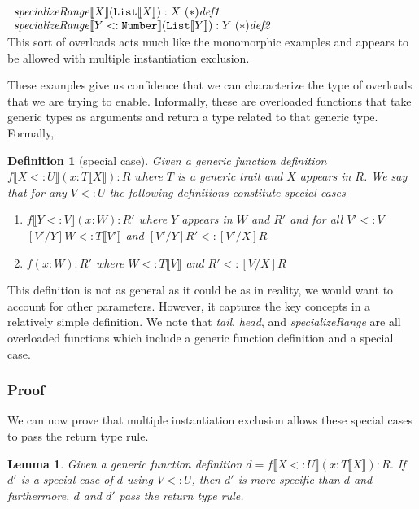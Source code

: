 \documentclass[preprint]{sigplanconf}
\newcommand{\ob}[1]{\ensuremath{\llbracket {#1} \rrbracket}}
\newtheorem{lemma}[theorem]{Lemma}
\newtheorem{definition}[theorem]{Definition}
\begin{document}
$\begin{array}{l}
{\it specializeRange}\ob{X}({\tt List}\ob{X}) : X~(*){\it def1}\\
{\it specializeRange}\ob{Y <: {\tt Number}}({\tt List}\ob{Y}) : Y~(*){\it def2}\\
\end{array}$\\

This sort of overloads acts much like the monomorphic examples and appears to
be allowed with multiple instantiation exclusion.

These examples give us confidence that we can characterize the type of overloads
that we are trying to enable.  Informally, these are overloaded functions that take generic types
as arguments and return a type related to that generic type.  Formally,

\begin{definition}[special case]
Given a generic function definition $f\ob{X <: U}(x : T\ob{X}) : R$
where $T$ is a generic trait and $X$ appears in $R$.  We say that for any $V <: U$ the following 
definitions constitute special cases
	\begin{enumerate}
    	\item $f\ob{Y <: V}(x : W) : R'$ where $Y$ appears in $W$ and $R'$ and for all $V' <: V$
        		$[V'/Y]W <: T\ob{V'}$ and $[V'/Y]R' <: [V'/X]R$
	\item $f(x : W) : R'$ where $W <: T\ob{V}$ and $R' <: [V/X]R$
	\end{enumerate}
\end{definition}

This definition is not as general as it could be as in reality, we would want to account for
other parameters.  However, it captures the key concepts in a relatively simple definition.
We note that {\it tail}, {\it head}, and {\it specializeRange} are all overloaded functions which
include a generic function definition and a special case.

\subsubsection{Proof}

We can now prove that multiple instantiation exclusion allows these special cases
to pass the return type rule.

\begin{lemma} 
Given a generic function definition $d=f\ob{X <: U}(x : T\ob{X}) : R$.  If $d'$ is a special 
case of $d$ using $V <: U$, then $d'$ is more specific than $d$ and furthermore, $d$ and $d'$ pass 
the return type rule.
\end{lemma}
\end{document}
